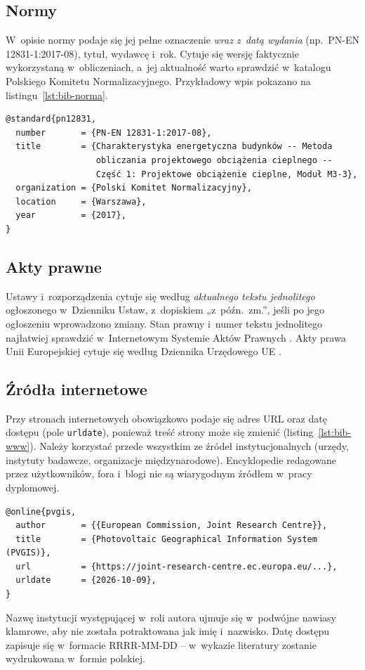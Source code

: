 \subsection{Normy}

W~opisie normy podaje się jej pełne oznaczenie \emph{wraz z~datą
wydania} (np.\ PN-EN 12831-1:2017-08), tytuł, wydawcę i~rok. Cytuje się
wersję faktycznie wykorzystaną w~obliczeniach, a~jej aktualność warto
sprawdzić w~katalogu Polskiego Komitetu Normalizacyjnego. Przykładowy
wpis pokazano na listingu~\ref{lst:bib-norma}.

\begin{lstlisting}[language={}, caption={Wpis normy w~pliku
  literatura.bib}, label={lst:bib-norma}]
@standard{pn12831,
  number       = {PN-EN 12831-1:2017-08},
  title        = {Charakterystyka energetyczna budynków -- Metoda
                  obliczania projektowego obciążenia cieplnego --
                  Część 1: Projektowe obciążenie cieplne, Moduł M3-3},
  organization = {Polski Komitet Normalizacyjny},
  location     = {Warszawa},
  year         = {2017},
}
\end{lstlisting}

\subsection{Akty prawne}

Ustawy i~rozporządzenia cytuje się według \emph{aktualnego tekstu
jednolitego} ogłoszonego w~Dzienniku Ustaw, z~dopiskiem „z~późn.~zm.”, jeśli
po jego ogłoszeniu wprowadzono zmiany. Stan prawny i~numer tekstu
jednolitego najłatwiej sprawdzić w~Internetowym Systemie Aktów Prawnych
\cite{isap}. Akty prawa Unii Europejskiej cytuje się według Dziennika
Urzędowego UE \cite{epbd2024}.

\subsection{Źródła internetowe}

Przy stronach internetowych obowiązkowo podaje się adres URL oraz datę
dostępu (pole \texttt{urldate}), ponieważ treść strony może się zmienić
(listing~\ref{lst:bib-www}). Należy korzystać przede wszystkim ze
źródeł instytucjonalnych (urzędy, instytuty badawcze, organizacje
międzynarodowe). Encyklopedie redagowane przez użytkowników, fora i~blogi
nie są wiarygodnym źródłem w~pracy dyplomowej.

\begin{lstlisting}[language={}, caption={Wpis strony internetowej
  w~pliku literatura.bib}, label={lst:bib-www}]
@online{pvgis,
  author       = {{European Commission, Joint Research Centre}},
  title        = {Photovoltaic Geographical Information System (PVGIS)},
  url          = {https://joint-research-centre.ec.europa.eu/...},
  urldate      = {2026-10-09},
}
\end{lstlisting}

Nazwę instytucji występującej w~roli autora ujmuje się w~podwójne
nawiasy klamrowe, aby nie została potraktowana jak imię i~nazwisko.
Datę dostępu zapisuje się w~formacie RRRR-MM-DD -- w~wykazie literatury
zostanie wydrukowana w~formie polskiej.
